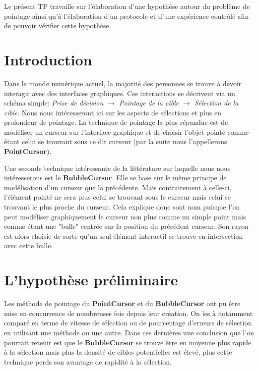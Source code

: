 \documentclass[a4paper, 12pt]{article}
\begin{document}
Le présent TP travaille sur l'élaboration d'une hypothèse autour du problème de pointage ainsi qu'à l'élaboration d'un protocole et d'une expérience contrôlé afin de pouvoir vérifier cette hypothèse.

\pagebreak

\renewcommand{\contentsname}{Sommaire}
\tableofcontents
\thispagestyle{empty}

\pagebreak
{}

\section{Introduction}

Dans le monde numérique actuel, la majorité des personnes se trouve à devoir interagir avec des interfaces graphiques. Ces interactions se décrivent via un schéma simple: \textit{Prise de décision $\rightarrow$ Pointage de la cible $\rightarrow$ Sélection de la cible}. Nous nous intéresseront ici sur les aspects de sélections et plus en profondeur de pointage. La technique de pointage la plus répandue est de modéliser un curseur sur l'interface graphique et de choisir l'objet pointé comme étant celui se trouvant sous ce dit curseur (par la suite nous l'appellerons \textbf{PointCursor}).

Une seconde technique intéressante de la littérature sur laquelle nous nous intéresserons est le \textbf{BubbleCursor}. Elle se base sur le même principe de modélisation d'un curseur que la précédente. Mais contrairement à celle-ci, l'élément pointé ne sera plus celui se trouvant sous le curseur mais celui se trouvant le plus proche du curseur. Cela explique donc sont nom puisque l'on peut modéliser graphiquement le curseur non plus comme un simple point mais comme étant une "bulle" centrée sur la position du précédent curseur. Son rayon est alors choisie de sorte qu'un seul élément interactif se trouve en intersection avec cette bulle.

\pagebreak
\section{L'hypothèse préliminaire}

Les méthode de pointage du \textbf{PointCursor} et du \textbf{BubbleCursor} ont pu être mise en concurrence de nombreuses fois depuis leur création. On les à notamment comparé en terme de vitesse de sélection ou de pourcentage d'erreurs de sélection en utilisant une méthode ou une autre. Dans ces dernières une conclusion que l'on pourrait retenir est que le \textbf{BubbleCursor} se trouve être en moyenne plus rapide à la sélection mais plus la densité de cibles potentielles est élevé, plus cette technique perds son avantage de rapidité à la sélection.
\end{document}
